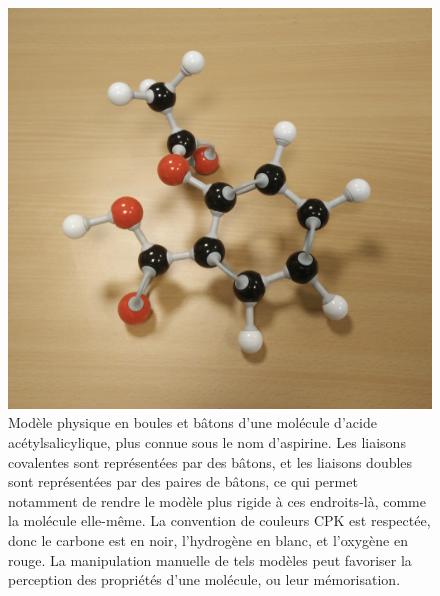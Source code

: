 	\begin{figure}[H]
		\centering
		\includegraphics[width=\textwidth]{figures/ch1/aspirin}
		\caption{Modèle physique en boules et bâtons d'une molécule d'acide acétylsalicylique, plus connue sous le nom d'aspirine. Les liaisons covalentes sont représentées par des bâtons, et les liaisons doubles sont représentées par des paires de bâtons, ce qui permet notamment de rendre le modèle plus rigide à ces endroits-là, comme la molécule elle-même. La convention de couleurs CPK est respectée, donc le carbone est en noir, l'hydrogène en blanc, et l'oxygène en rouge. La manipulation manuelle de tels modèles peut favoriser la perception des propriétés d'une molécule, ou leur mémorisation.}
		\label{fig:aspirin}
	\end{figure}
	
